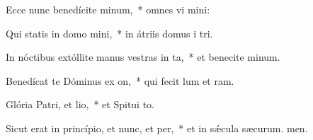 \item Ecce nunc benedícite minum,~* omnes vi mini:
\item Qui statis in domo mini,~* in átriis domus i tri.
\item In nóctibus extóllite manus vestras in ta,~* et benecite minum.
\item Benedícat te Dóminus ex on,~* qui fecit lum et ram.
\item Glória Patri, et lio,~* et Spitui to.
\item Sicut erat in princípio, et nunc, et per,~* et in sǽcula sæcurum. men.
